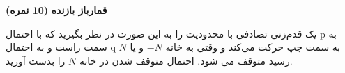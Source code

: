 \Large \textbf{قمارباز بازنده}
\large \textbf{(10 نمره)}

\normalsize \vspace{0.5cm}

یک قدم‌زنی تصادفی با محدودیت را به این صورت در نظر بگیرید که با احتمال p به سمت راست و به احتمال q به سمت جپ حرکت می‌کند و وقتی به خانه $-N$ و یا $N$ رسید متوقف می شود. احتمال متوقف شدن در خانه $N$ را بدست آورید.
	